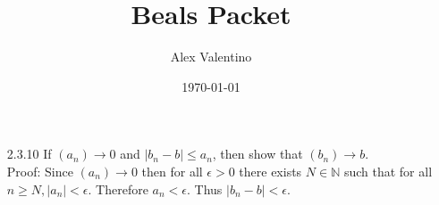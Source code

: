 \documentclass[12pt, letterpaper]{article}
\date{\today}
\author{Alex Valentino}
\title{Beals Packet}
\newcommand{\N}{\mathbb{N}}
\begin{document}
\begin{enumerate}
	\item[2.3.10] If $(a_n) \to 0$ and $|b_n - b| \leq a_n$, then show that 
	$(b_n) \to b$.\\
	Proof:  Since $(a_n) \to 0$ then for all $\epsilon > 0$ there exists $N \in \N$
	such that for all $n \geq N, |a_n| < \epsilon$.  Therefore $a_n < \epsilon$.  Thus $|b_n - b| < \epsilon$.     
\end{enumerate}
\end{document}
